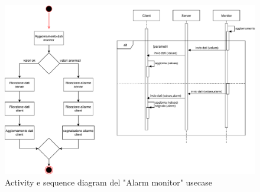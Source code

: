 \documentclass{article}
\begin{document}
\begin{figure}[H]

		\includegraphics[width=1.1\textwidth]{documenti/Diagrams_monitorAgg.pdf}
		\caption{Activity e sequence diagram del "Alarm monitor" usecase}
		\label{Diagrams_monitorAgg}

	\end{figure}


\vspace{2cm}
\end{document}
